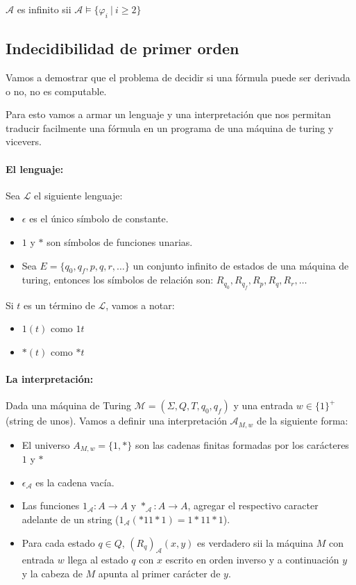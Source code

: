 \begin{proposicion} $\mathcal{A}$ es infinito sii $\mathcal{A}\vDash\{\varphi_i~|~i\geq 2\}$
\end{proposicion}

\subsection{Indecidibilidad de primer orden}
Vamos a demostrar que el problema de decidir si una fórmula puede ser derivada o no, no es computable.

Para esto vamos a armar un lenguaje y una interpretación que nos permitan traducir facilmente una fórmula en un programa de una máquina de turing y vicevers.

\paragraph{El lenguaje:}
Sea $\mathcal{L}$ el siguiente lenguaje:
\begin{itemize}
	\item $\epsilon$ es el único símbolo de constante.
	\item $1$ y $*$ son símbolos de funciones unarias.
	\item Sea $E = \{q_0,q_f,p,q,r,\dots\}$ un conjunto infinito de estados de una máquina de turing, entonces los símbolos de relación son: $R_{q_0},R_{q_f},R_p,R_q, R_r,\dots$
\end{itemize}

Si $t$ es un término de $\mathcal{L}$, vamos a notar:
\begin{itemize}
	\item $1(t)$ como $1t$
	\item $*(t)$ como $*t$
\end{itemize}

\paragraph{La interpretación:} Dada una máquina de Turing $\mathcal{M} =(\Sigma,Q,T,q_0,q_f)$ y una entrada $w\in\{1\}^+$ (string de unos). Vamos a definir una interpretación $\mathcal{A}_{M,w}$ de la siguiente forma:

\begin{itemize}
	\item El universo $A_{M,w} = \{1,*\}$ son las cadenas finitas formadas por los carácteres $1$ y $*$
	\item $\epsilon_\mathcal{A}$ es la cadena vacía.
	\item Las funciones $1_\mathcal{A}:A\to A$ y $*_\mathcal{A}:A\to A$, agregar el respectivo caracter adelante de un string ($1_\mathcal{A}(*11*1) = 1*11*1$).
	\item Para cada estado $q\in Q$, $(R_q)_\mathcal{A}(x,y)$ es verdadero sii la máquina $M$ con entrada $w$ llega al estado $q$ con $x$ escrito en orden inverso y a continuación $y$ y la cabeza de $M$ apunta al primer carácter de $y$.
\end{itemize} 

